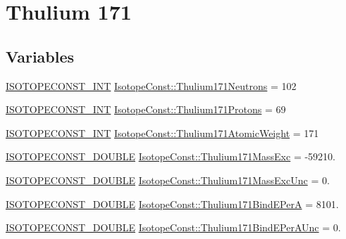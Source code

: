 \hypertarget{group___isotope_const-_thulium-_tm171}{}\section{Thulium 171}
\label{group___isotope_const-_thulium-_tm171}
\subsection*{Variables}
\begin{DoxyCompactItemize}
\item 
\mbox{\hyperlink{group___isotope_const-_macros_ga5f18360b3e99483a35c32d789e62621c}{I\+S\+O\+T\+O\+P\+E\+C\+O\+N\+S\+T\+\_\+\+I\+NT}} \mbox{\hyperlink{group___isotope_const-_thulium-_tm171_ga9e2509ab9868e65c9d8d050fbb507598}{Isotope\+Const\+::\+Thulium171\+Neutrons}} = 102
\item 
\mbox{\hyperlink{group___isotope_const-_macros_ga5f18360b3e99483a35c32d789e62621c}{I\+S\+O\+T\+O\+P\+E\+C\+O\+N\+S\+T\+\_\+\+I\+NT}} \mbox{\hyperlink{group___isotope_const-_thulium-_tm171_gad3ef552a0085b339e2495f7fd78b3628}{Isotope\+Const\+::\+Thulium171\+Protons}} = 69
\item 
\mbox{\hyperlink{group___isotope_const-_macros_ga5f18360b3e99483a35c32d789e62621c}{I\+S\+O\+T\+O\+P\+E\+C\+O\+N\+S\+T\+\_\+\+I\+NT}} \mbox{\hyperlink{group___isotope_const-_thulium-_tm171_ga094fb0dd560ff5fa86ff405571396bdb}{Isotope\+Const\+::\+Thulium171\+Atomic\+Weight}} = 171
\item 
\mbox{\hyperlink{group___isotope_const-_macros_ga8f45a7272ce02c0b4c65c44636ed719a}{I\+S\+O\+T\+O\+P\+E\+C\+O\+N\+S\+T\+\_\+\+D\+O\+U\+B\+LE}} \mbox{\hyperlink{group___isotope_const-_thulium-_tm171_ga38ee05b3339543613bcfb72c8ec47556}{Isotope\+Const\+::\+Thulium171\+Mass\+Exc}} = -\/59210.
\item 
\mbox{\hyperlink{group___isotope_const-_macros_ga8f45a7272ce02c0b4c65c44636ed719a}{I\+S\+O\+T\+O\+P\+E\+C\+O\+N\+S\+T\+\_\+\+D\+O\+U\+B\+LE}} \mbox{\hyperlink{group___isotope_const-_thulium-_tm171_ga6220ddacddbe13fca6a2df403efcfc23}{Isotope\+Const\+::\+Thulium171\+Mass\+Exc\+Unc}} = 0.
\item 
\mbox{\hyperlink{group___isotope_const-_macros_ga8f45a7272ce02c0b4c65c44636ed719a}{I\+S\+O\+T\+O\+P\+E\+C\+O\+N\+S\+T\+\_\+\+D\+O\+U\+B\+LE}} \mbox{\hyperlink{group___isotope_const-_thulium-_tm171_ga6b1bcd381f2644846802141e2ef363f3}{Isotope\+Const\+::\+Thulium171\+Bind\+E\+PerA}} = 8101.
\item 
\mbox{\hyperlink{group___isotope_const-_macros_ga8f45a7272ce02c0b4c65c44636ed719a}{I\+S\+O\+T\+O\+P\+E\+C\+O\+N\+S\+T\+\_\+\+D\+O\+U\+B\+LE}} \mbox{\hyperlink{group___isotope_const-_thulium-_tm171_gaab34ac15ff5375667c37e4b73490b7fc}{Isotope\+Const\+::\+Thulium171\+Bind\+E\+Per\+A\+Unc}} = 0.

\end{DoxyCompactItemize}
